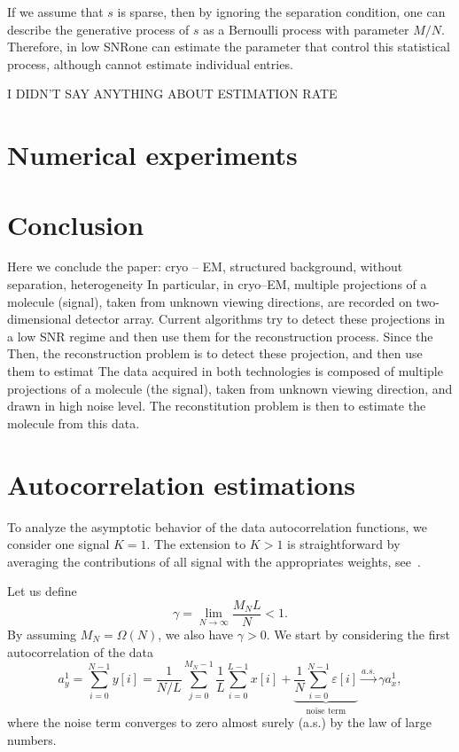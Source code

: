 \documentclass[english]{article}
\numberwithin{equation}{section}
\theoremstyle{plain}
\theoremstyle{definition}
\theoremstyle{remark}
\theoremstyle{plain}
\theoremstyle{remark}
\theoremstyle{plain}
\theoremstyle{plain}
\newcommand{\SNR}{{\textsf{SNR}}}
\begin{document}
If we assume that $s$ is sparse, then by ignoring the separation condition, one can describe the generative process of $s$ as a Bernoulli process with parameter $M/N$. Therefore, in low \SNR  one can estimate the parameter that control this statistical process, although cannot estimate individual entries.

I DIDN'T SAY ANYTHING ABOUT ESTIMATION RATE

\section{Numerical experiments}   \label{sec:numerics}



\section{Conclusion} 
Here we conclude the paper: cryo -- EM, structured background, without separation, heterogeneity
In particular, in cryo--EM, multiple projections of a molecule (signal), taken
from unknown viewing directions, are recorded on two-dimensional detector
array. Current algorithms try to detect these projections in a low SNR regime
and then use them for the reconstruction process. Since the
Then, the reconstruction problem is to detect these projection, and then use
them to estimat
The data acquired in both technologies is composed of multiple projections
of a molecule (the signal), taken from unknown viewing direction, and drawn in
high noise level. The reconstitution problem is then to estimate the molecule
from this data.







\appendix

\section{Autocorrelation estimations} \label{sec:autocorrelation_computation}
 
To analyze the asymptotic behavior of the data autocorrelation functions, we consider one signal $K=1$. The extension to $K>1$ is straightforward by averaging the contributions of all signal with the appropriates weights, see~\cite{boumal2017heterogeneous}. 

Let us define
\begin{equation}
\gamma = \lim_{N\to\infty} \frac{M_NL}{N}<1.
\end{equation}
By assuming $M_N=\Omega(N)$, we also have $\gamma>0$.
We start by considering the first autocorrelation of the data
\begin{equation}
a_y^1 = \sum_{i=0}^{N-1} y[i] = \frac{1}{N/L}\sum_{j=0}^{M_N-1}\frac{1}{L}\sum_{i=0}^{L-1}x[i] + \underbrace{\frac{1}{N}\sum_{i=0}^{N-1}\varepsilon[i]}_{\text{noise term}} \xrightarrow{a.s.}\gamma a_x^1,
\end{equation}
where the noise term converges to zero almost surely (a.s.) by the law of large numbers.
\end{document}
